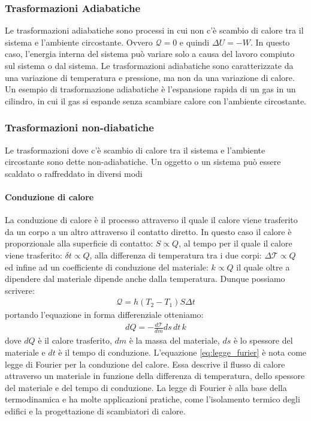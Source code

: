         \subsubsection{Trasformazioni Adiabatiche}
            Le trasformazioni adiabatiche sono processi in cui non c'è scambio di calore tra il sistema e l'ambiente circostante. Ovvero $\mathcal{Q}=0$ e quindi $\Delta U = -W$. In questo caso, l'energia interna del sistema può variare solo a causa del lavoro compiuto sul sistema o dal sistema. Le trasformazioni adiabatiche sono caratterizzate da una variazione di temperatura e pressione, ma non da una variazione di calore. Un esempio di trasformazione adiabatiche è l'espansione rapida di un gas in un cilindro, in cui il gas si espande senza scambiare calore con l'ambiente circostante.
        \subsubsection{Trasformazioni non-diabatiche}
            Le trasformazioni dove c'è scambio di calore tra il sistema e l'ambiente circostante sono dette non-adiabatiche. Un oggetto o un sistema può essere scaldato o raffreddato in diversi modi
                \paragraph{Conduzione di calore} 
                    La conduzione di calore è il processo attraverso il quale il calore viene trasferito da un corpo a un altro attraverso il contatto diretto. In questo caso il calore è proporzionale alla superficie di contatto: $S\propto Q$, al tempo per il quale il calore viene trasferito: $\delta t\propto Q$, alla differenza di temperatura tra i due corpi: $\Delta \mathcal{T}\propto Q$ ed infine ad un coefficiente di conduzione del materiale: $k\propto Q$ il quale oltre a dipendere dal materiale dipende anche dalla temperatura. Dunque possiamo scrivere:
                    \begin{align}
                        \mathcal{Q}=h(T_2-T_1)S\Delta t
                    \end{align}
                    portando l'equazione in forma differenziale otteniamo:
                    \begin{align}
                        dQ = -\frac{d\mathcal{T}}{dm}ds\, dt\, k \label{eq:legge_furier}
                    \end{align}
                    dove $dQ$ è il calore trasferito, $dm$ è la massa del materiale, $ds$ è lo spessore del materiale e $dt$ è il tempo di conduzione. L'equazione \ref{eq:legge_furier} è nota come legge di Fourier per la conduzione del calore. Essa descrive il flusso di calore attraverso un materiale in funzione della differenza di temperatura, dello spessore del materiale e del tempo di conduzione. La legge di Fourier è alla base della termodinamica e ha molte applicazioni pratiche, come l'isolamento termico degli edifici e la progettazione di scambiatori di calore.
